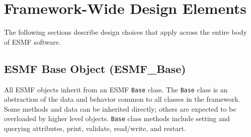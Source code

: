 \section{Framework-Wide Design Elements}
\label{sec:fwdesign}

The following sections describe design choices that apply across the 
entire body of ESMF software.

\subsection{ESMF Base Object (ESMF\_Base)}
\label{sec:esmfbase}

\label{sec:Base} 
All ESMF objects inherit from an ESMF {\tt Base} class.  
The {\tt Base} class is an abstraction of the data and behavior common to all
classes in the framework.  Some methods and data can be
inherited directly; others are expected to be overloaded by
higher level objects.  {\tt Base} class methods include setting and querying attributes,
print, validate, read/write, and restart. 








